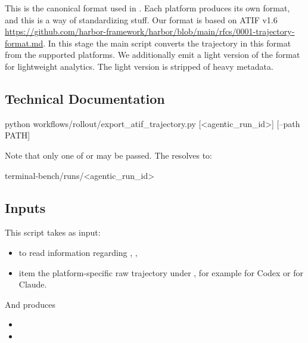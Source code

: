 \documentclass[11pt]{article}
\begin{document}
\label{docstart:atif_transcription}
This is the canonical format used in \name{}. 
Each platform produces its own format, and this is a way of standardizing stuff.
Our format is based on ATIF v1.6 \url{https://github.com/harbor-framework/harbor/blob/main/rfcs/0001-trajectory-format.md}.
In this stage the main script converts the trajectory in this format from the supported platforms.
We additionally emit a light version of the format for lightweight analytics.
The light version is stripped of heavy metadata.

\subsection*{Technical Documentation}
\begin{DocCode}
python workflows/rollout/export_atif_trajectory.py [<agentic_run_id>] [--path PATH]
\end{DocCode}
Note that only one of  or  may be passed.
The  resolves to:
\begin{DocCode}
terminal-bench/runs/<agentic_run_id>
\end{DocCode}

\subsection*{Inputs}
This script takes as input:
\begin{itemize}
  \item {} to read information regarding , , 
  \item item the platform-specific raw trajectory under ,
  for example  for Codex or  for Claude.
\end{itemize}

And produces
\begin{itemize}
  \item {}
  \item {}
\end{itemize}
\end{document}
